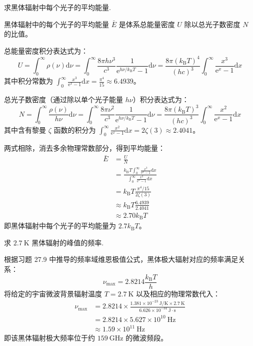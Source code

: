 \begin{exercise}\label{ex:27.11}
求黑体辐射中每个光子的平均能量.
\end{exercise}
\begin{solution}
黑体辐射中的每个光子的平均能量 $\bar{E}$ 是体系总能量密度 $U$ 除以总光子数密度 $N$ 的比值。

总能量密度积分表达式为：
$$ U = \int_0^\infty \rho(\nu) \mathrm{d}\nu = \int_0^\infty \frac{8\pi h \nu^3}{c^3} \frac{1}{\mathrm{e}^{h\nu/k_{\mathrm{B}} T} - 1} \mathrm{d}\nu = \frac{8\pi (k_{\mathrm{B}} T)^4}{(hc)^3} \int_0^\infty \frac{x^3}{\mathrm{e}^x - 1} \mathrm{d}x $$
其中积分常数为 $\int_0^\infty \frac{x^3}{\mathrm{e}^x - 1} \mathrm{d}x = \frac{\pi^4}{15} \approx 6.4939$。

总光子数密度（通过除以单个光子能量 $h\nu$）积分表达式为：
$$ N = \int_0^\infty \frac{\rho(\nu)}{h\nu} \mathrm{d}\nu = \int_0^\infty \frac{8\pi \nu^2}{c^3} \frac{1}{\mathrm{e}^{h\nu/k_{\mathrm{B}} T} - 1} \mathrm{d}\nu = \frac{8\pi (k_{\mathrm{B}} T)^3}{(hc)^3} \int_0^\infty \frac{x^2}{\mathrm{e}^x - 1} \mathrm{d}x $$
其中含有黎曼 $\zeta$ 函数的积分为 $\int_0^\infty \frac{x^2}{\mathrm{e}^x - 1} \mathrm{d}x = 2\zeta(3) \approx 2.4041$。

两式相除，消去多余物理常数部分，得到平均能量：
\[
\begin{aligned}
\bar{E} &= \frac{U}{N}\\
  &= \frac{k_{\mathrm{B}} T \int_0^\infty \frac{x^3}{\mathrm{e}^x - 1} \mathrm{d}x}{\int_0^\infty \frac{x^2}{\mathrm{e}^x - 1} \mathrm{d}x}\\
  &= k_{\mathrm{B}} T \frac{\pi^4 / 15}{2\zeta(3)}\\
  &\approx k_{\mathrm{B}} T \frac{6.4939}{2.4041}\\
  &\approx 2.70 k_{\mathrm{B}} T
\end{aligned}
\]
即黑体辐射中每个光子的平均能量为 $2.7 k_{\mathrm{B}} T$。
\end{solution}

\begin{exercise}\label{ex:27.12}
求 $2.7 \ \mathrm{K}$ 黑体辐射的峰值的频率.
\end{exercise}
\begin{solution}
根据习题 27.9 中推导的频率域维恩极值公式，黑体极大辐射对应的频率满足关系：
$$ \nu_{\max} = 2.8214 \frac{k_{\mathrm{B}} T}{h} $$
将给定的宇宙微波背景辐射温度 $T = 2.7 \ \mathrm{K}$ 以及相应的物理常数代入：
\[
\begin{aligned}
\nu_{\max} &= 2.8214 \times \frac{1.381 \times 10^{-23} \ \mathrm{J/K} \times 2.7 \ \mathrm{K}}{6.626 \times 10^{-34} \ \mathrm{J \cdot s}}\\
  &= 2.8214 \times 5.627 \times 10^{10} \ \mathrm{Hz}\\
  &\approx 1.59 \times 10^{11} \ \mathrm{Hz}
\end{aligned}
\]
即该黑体辐射极大频率位于约 $159 \ \mathrm{GHz}$ 的微波频段。
\end{solution}

